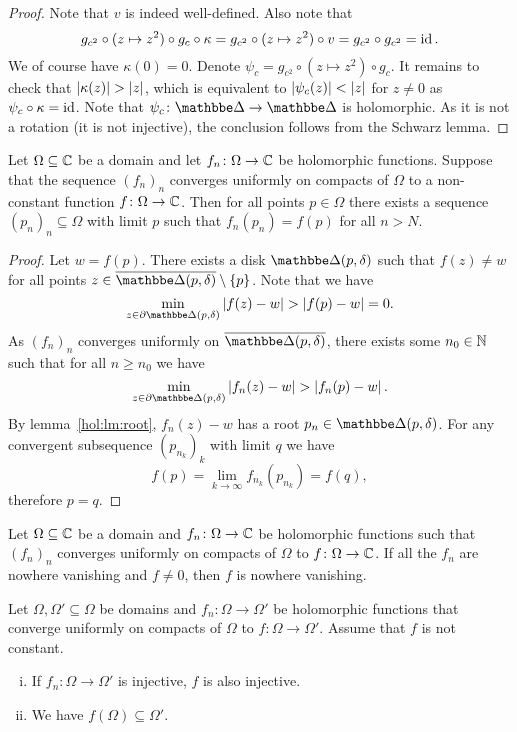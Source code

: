 \begin{proof}
Note that $v$ is indeed well-defined. Also note that
\[
g_{c^2} \circ (z \mapsto z^2) \circ g_c \circ \kappa =
g_{c^2} \circ (z \mapsto z^2) \circ v =
g_{c^2} \circ g_{c^2} =
\operatorname{id}.
\]
We of course have $\kappa(0) = 0$. Denote
$\psi_c = g_{c^2} \circ (z \mapsto z^2) \circ g_c$. It remains to
check that $\left\lvert \kappa(z)\right\rvert > \left\lvert z\right\rvert$, which is equivalent to
$\left\lvert \psi_c(z)\right\rvert < \left\lvert z\right\rvert$ for $z \ne 0$ as
$\psi_c \circ \kappa = \operatorname{id}$. Note that
$\psi_c \colon \dsk \to \dsk$ is holomorphic. As it is not a
rotation (it is not injective), the conclusion follows from the
Schwarz lemma.
\end{proof}

\begin{lema}[Hurwitz]
Let $\Omega \subseteq \mathbb{C}$ be a domain and let
$f_n \colon \Omega \to \mathbb{C}$ be holomorphic functions. Suppose that
the sequence $(f_n)_n$ converges uniformly on compacts of $\Omega$
to a non-constant function $f \colon \Omega \to \mathbb{C}$. Then for all
points $p \in \Omega$ there exists a sequence
$(p_n)_n \subseteq \Omega$ with limit $p$ such that
$f_n(p_n) = f(p)$ for all $n > N$.
\end{lema}

\begin{proof}
Let $w = f(p)$. There exists a disk $\dsk(p, \delta)$ such that
$f(z) \ne w$ for all points
$z \in \oline{\dsk(p, \delta)} \setminus \set{p}$. Note that we
have
\[
\min_{z \in \partial \dsk(p, \delta)} \abs{f(z) - w} >
\abs{f(p) - w} =
0.
\]
As $(f_n)_n$ converges uniformly on $\oline{\dsk(p, \delta)}$,
there exists some $n_0 \in \mathbb{N}$ such that for all $n \geq n_0$ we
have
\[
\min_{z \in \partial \dsk(p, \delta)} \abs{f_n(z) - w} >
\abs{f_n(p) - w}.
\]
By lemma~\ref{hol:lm:root}, $f_n(z) - w$ has a root
$p_n \in \dsk(p, \delta)$. For any convergent subsequence
$(p_{n_k})_k$ with limit $q$ we have
\[
f(p) = \lim_{k \to \infty} f_{n_k}(p_{n_k}) = f(q),
\]
therefore $p = q$.
\end{proof}

\begin{posledica}
Let $\Omega \subseteq \mathbb{C}$ be a domain and
$f_n \colon \Omega \to \mathbb{C}$ be holomorphic functions such that
$(f_n)_n$ converges uniformly on compacts of $\Omega$ to
$f \colon \Omega \to \mathbb{C}$. If all the $f_n$ are nowhere vanishing
and $f \ne 0$, then $f$ is nowhere vanishing.
\end{posledica}

\obvs

\begin{izrek}[Hurwitz]
Let $\Omega, \Omega' \subseteq \Omega$ be domains and
$f_n \colon \Omega \to \Omega'$ be holomorphic functions that
converge uniformly on compacts of $\Omega$ to
$f \colon \Omega \to \Omega'$. Assume that $f$ is not constant.

\begin{enumerate}[i)]
\item If $f_n \colon \Omega \to \Omega'$ is injective, $f$ is also
injective.
\item We have $f(\Omega) \subseteq \Omega'$.
\end{enumerate}
\end{izrek}


